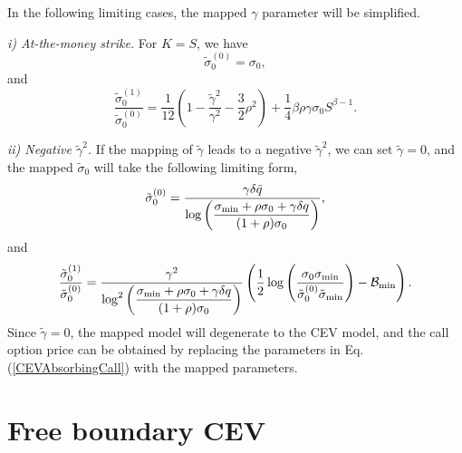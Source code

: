 \documentclass[12pt]{article}
\begin{document}
      In the following limiting cases, the mapped $\gamma$ parameter will be simplified.

      {\it i) At-the-money strike.} For $K=S$, we have
      \begin{equation}
        \tilde{\sigma}_0^{(0)}=\sigma_0,
      \end{equation}
      and
      \begin{equation}
        \frac{\tilde{\sigma}_0^{(1)}}{\tilde{\sigma}_0^{(0)}}=\frac{1}{12}
        \left(1-\frac{\tilde{\gamma}^2}{\gamma^2}-\frac{3}{2}\rho^2\right)
        +\frac{1}{4}\beta\rho\gamma\sigma_0S^{\beta -1}.
      \end{equation}

      {\it ii) Negative $\tilde{\gamma}^2$.} If the mapping of $\tilde{\gamma}$ leads to a
      negative $\tilde{\gamma}^2$, we can set $\tilde{\gamma}=0$, and the mapped $\tilde{\sigma}_0$
      will take the following limiting form,
      \begin{equation}
        \tilde{\sigma}_0^{(0)}=\frac{\gamma\delta\tilde{q}}
        {\displaystyle \log\left(\frac{\sigma_{{\rm min}}+\rho\sigma_0+\gamma\delta q}{(1+\rho)\sigma_0}\right)},
      \end{equation}
      and
      \begin{equation}
        \frac{\tilde{\sigma}_0^{(1)}}{\tilde{\sigma}_0^{(0)}}=\frac{\gamma^2}
        {\displaystyle \log^2\left(\frac{\sigma_{{\rm min}}+\rho\sigma_0+\gamma\delta q}{(1+\rho)\sigma_0}\right)}
        \left(\frac{1}{2}\log\left(\frac{\sigma_0\sigma_{{\rm min}}}{\tilde{\sigma}_0^{(0)}\tilde{\sigma}_{{\rm min}}}\right)
                                                -\mathcal{B}_{{\rm min}}\right).
      \end{equation}
      Since $\tilde{\gamma}=0$, the mapped model will degenerate to the CEV model, and the call option price
      can be obtained by replacing the parameters in Eq. (\ref{CEVAbsorbingCall}) with the mapped parameters.





\section{Free boundary CEV}
\end{document}
